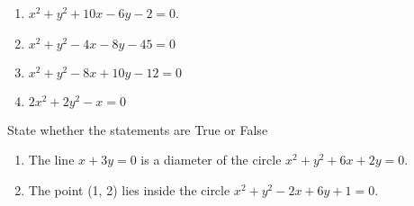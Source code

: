 \begin{enumerate}[label=\thesubsection.\arabic*, ref=\thesubsection.\theenumi, resume*]
\item  $x^2+y^2 +10x -6y -2=0$. 
	 \\
		\solution
\label{chapters/11/11/1/6}

\item  $x^{2}+y^{2}-4 x-8 y-45=0$
	 \\
		\solution
\label{chapters/11/11/1/7}

\item  $x^{2}+y^{2}-8 x+10 y-12=0$ 
	 \\
		\solution
\label{chapters/11/11/1/8}

\item  $2 x^{2}+2 y^{2}-x=0$
	 \\
		\solution
\label{chapters/11/11/1/9}

\end{enumerate}
State whether the statements are True or False 
\begin{enumerate}[label=\thesubsection.\arabic*, ref=\thesubsection.\theenumi, resume*]
\item The line $x+3y=0$ is a diameter of the circle $x^2+y^2+6x+2y=0$.
\item The point (1, 2) lies inside the circle $x^2+y^2-2x+6y+1=0$.
\end{enumerate}

